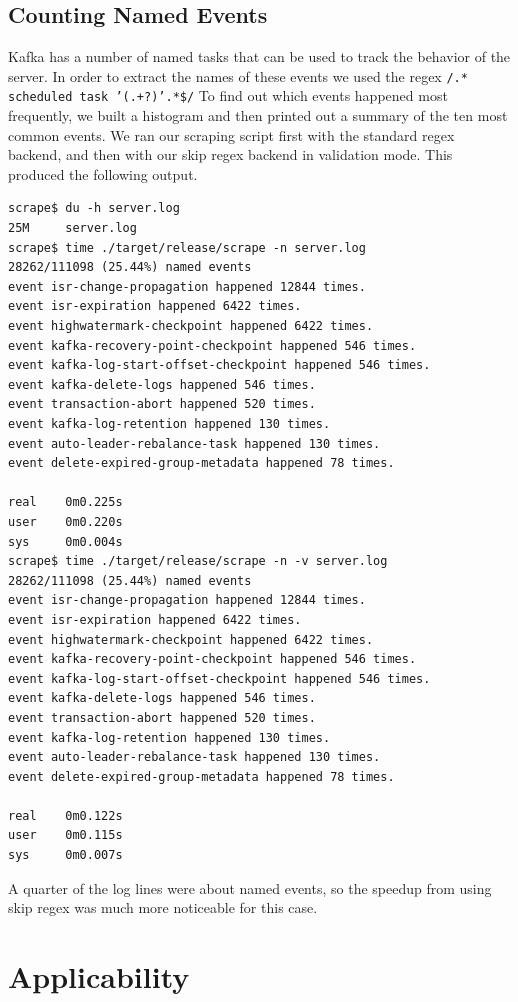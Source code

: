 \subsection{Counting Named Events}

Kafka has a number of named tasks that can be used to track
the behavior of the server. In order to extract the names
of these events we used the regex 
\texttt{/.* \allowbreak scheduled \allowbreak task \allowbreak '(.+?)'.*\$/}
To find out which events happened most frequently, we built
a histogram and then printed out a summary of the ten most
common events. We ran our scraping script first with the standard regex
backend, and then with our skip regex backend in validation
mode. This produced the following output.

\begin{verbatim}
scrape$ du -h server.log 
25M     server.log
scrape$ time ./target/release/scrape -n server.log 
28262/111098 (25.44%) named events
event isr-change-propagation happened 12844 times.
event isr-expiration happened 6422 times.
event highwatermark-checkpoint happened 6422 times.
event kafka-recovery-point-checkpoint happened 546 times.
event kafka-log-start-offset-checkpoint happened 546 times.
event kafka-delete-logs happened 546 times.
event transaction-abort happened 520 times.
event kafka-log-retention happened 130 times.
event auto-leader-rebalance-task happened 130 times.
event delete-expired-group-metadata happened 78 times.

real    0m0.225s
user    0m0.220s
sys     0m0.004s
scrape$ time ./target/release/scrape -n -v server.log 
28262/111098 (25.44%) named events
event isr-change-propagation happened 12844 times.
event isr-expiration happened 6422 times.
event highwatermark-checkpoint happened 6422 times.
event kafka-recovery-point-checkpoint happened 546 times.
event kafka-log-start-offset-checkpoint happened 546 times.
event kafka-delete-logs happened 546 times.
event transaction-abort happened 520 times.
event kafka-log-retention happened 130 times.
event auto-leader-rebalance-task happened 130 times.
event delete-expired-group-metadata happened 78 times.

real    0m0.122s
user    0m0.115s
sys     0m0.007s
\end{verbatim}

A quarter of the log lines were about named events, so the speedup
from using skip regex was much more noticeable for this case.

\section{Applicability}
\label{section:applicability}


